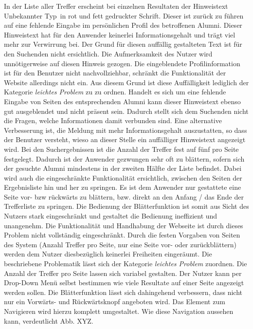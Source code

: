 {
	In der Liste aller Treffer erscheint bei einzelnen Resultaten der Hinweistext \glqq Unbekannter Typ\grqq ~in rot und fett gedruckter Schrift. Dieser ist zurück zu führen auf eine  fehlende Eingabe im persönlichen Profil des betroffenen Alumni. Dieser Hinweistext hat für den Anwender keinerlei Informationsgehalt und trägt viel mehr zur Verwirrung bei. Der Grund für diesen auffällig gestalteten Text ist für den Suchenden nicht ersichtlich. Die Aufmerksamkeit des Nutzer wird unnötigerweise auf diesen Hinweis gezogen.
}
{
	 Die eingeblendete Profilinformation ist für den Benutzer nicht nachvollziehbar, schränkt die Funktionalität der Website allerdings nicht ein. Aus diesem Grund ist diese Auffälligkeit lediglich der Kategorie \emph{leichtes Problem} zu zu ordnen.
}
{
	Handelt es sich um eine fehlende Eingabe von Seiten des entsprechenden Alumni kann dieser Hinweistext ebenso gut ausgeblendet und nicht präsent sein. Dadurch stellt sich dem Suchenden nicht die Fragen, welche Informationen damit verbunden sind. Eine alternative Verbesserung ist, die Meldung mit mehr Informationsgehalt auszustatten, so dass der Benutzer versteht, wieso an dieser Stelle ein auffälliger Hinweistext angezeigt wird.
}
{
	Bei den Suchergebnissen ist die Anzahl der Treffer fest auf fünf pro Seite festgelegt. Dadurch ist der Anwender gezwungen sehr oft zu blättern, sofern sich der gesuchte Alumni mindestens in der zweiten Hälfte der Liste befindet. Dabei wird auch die eingeschränkte Funktionalität ersichtlich, zwischen den Seiten der Ergebnisliste hin und her zu springen. Es ist dem Anwender nur gestattete eine Seite vor- bzw rückwärts zu blättern, bzw. direkt an den Anfang / das Ende der Trefferliste zu springen. Die Bedienung der Blätterfunktion ist somit aus Sicht des Nutzers stark eingeschränkt und gestaltet die Bedienung ineffizient und unangenehm.
}
{
	Die Funktionalität und Handhabung der Webseite ist durch dieses Problem nicht vollständig eingeschränkt. Durch die festen Vorgaben von Seiten des System (Anzahl Treffer pro Seite, nur eine Seite vor- oder zurückblättern) werden dem Nutzer diesbezüglich keinerlei Freiheiten eingeräumt. Die beschriebene Problematik lässt sich der Kategorie \emph{leichtes Problem} zuordnen.
	}
{
	Die Anzahl der Treffer pro Seite lassen sich variabel gestalten. Der Nutzer kann per Drop-Down Menü selbst bestimmen wie viele Resultate auf einer Seite angezeigt werden sollen. Die Blätterfunktion lässt sich dahingehend verbessern, dass nicht nur ein Vorwärts- und Rückwärtsknopf angeboten wird. Das Element zum Navigieren wird hierzu komplett umgestaltet. Wie diese Navigation aussehen kann, verdeutlicht Abb. XYZ.
}